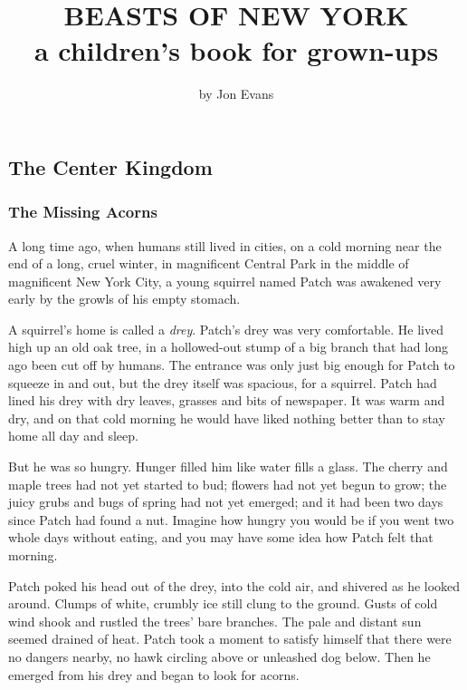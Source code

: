 \documentclass[12pt]{book}
\title{BEASTS OF NEW YORK\\a children's book for grown-ups}
\author{by Jon Evans}
\date{}
\begin{document}
\maketitle


\part{}

\chapter{The Center Kingdom}

\section{The Missing Acorns}

A long time ago, when humans still lived in cities, on a cold morning near the end of a long, cruel winter, in magnificent Central Park in the middle of magnificent New York City, a young squirrel named Patch was awakened very early by the growls of his empty stomach.

A squirrel's home is called a {\it drey}. Patch's drey was very comfortable. He lived high up an old oak tree, in a hollowed-out stump of a big branch that had long ago been cut off by humans. The entrance was only just big enough for Patch to squeeze in and out, but the drey itself was spacious, for a squirrel. Patch had lined his drey with dry leaves, grasses and bits of newspaper. It was warm and dry, and on that cold morning he would have liked nothing better than to stay home all day and sleep.

But he was so hungry. Hunger filled him like water fills a glass. The cherry and maple trees had not yet started to bud; flowers had not yet begun to grow; the juicy grubs and bugs of spring had not yet emerged; and it had been two days since Patch had found a nut. Imagine how hungry you would be if you went two whole days without eating, and you may have some idea how Patch felt that morning.

Patch poked his head out of the drey, into the cold air, and shivered as he looked around. Clumps of white, crumbly ice still clung to the ground. Gusts of cold wind shook and rustled the trees' bare branches. The pale and distant sun seemed drained of heat. Patch took a moment to satisfy himself that there were no dangers nearby, no hawk circling above or unleashed dog below. Then he emerged from his drey and began to look for acorns.
\end{document}
